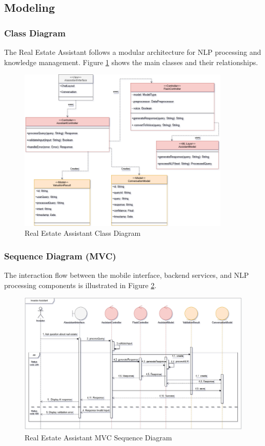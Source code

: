 \newpage

\subsection{Modeling}
\subsubsection{Class Diagram}
The Real Estate Assistant follows a modular architecture for NLP processing and knowledge management. Figure \ref{fig:assistant-class-diagram} shows the main classes and their relationships.

\begin{figure}[htbp]
    \centering
    \includegraphics[width=0.9\textwidth]{images/assistant_class_diagram.png}
    \caption{Real Estate Assistant Class Diagram}
    \label{fig:assistant-class-diagram}
\end{figure}

\subsubsection{Sequence Diagram (MVC)}
The interaction flow between the mobile interface, backend services, and NLP processing components is illustrated in Figure \ref{fig:assistant-sequence-mvc}.
\newpage
\begin{figure}[htbp]
    \centering
    \includegraphics[width=1\textwidth]{images/assistant_sequence_mvc.png}
    \caption{Real Estate Assistant MVC Sequence Diagram}
    \label{fig:assistant-sequence-mvc}
\end{figure}

